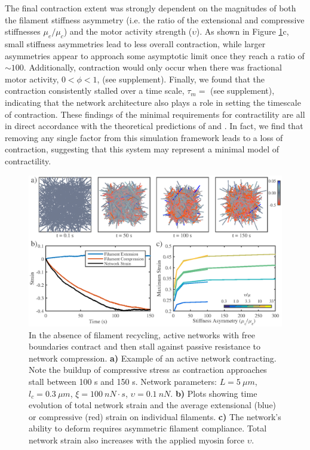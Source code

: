 \documentclass[10pt,letterpaper]{article}
\begin{document}
The final contraction extent was strongly dependent on the magnitudes of both the filament stiffness asymmetry (i.e. the ratio of the extensional and compressive stiffnesses $\mu_e/\mu_c$) and the motor activity strength ($\upsilon$).  As shown in Figure \ref{fig:active_con}c, small stiffness asymmetries lead to less overall contraction, while larger asymmetries appear to approach some asymptotic limit once they reach a ratio of $\sim 100$.  Additionally, contraction would only occur when there was fractional motor activity, $0<\phi<1$, (see supplement).  Finally, we found that the contraction consistently stalled over a time scale, $\tau_m=$ (see supplement), indicating that the network architecture also plays a role in setting the timescale of contraction.  These findings of the minimal requirements for contractility are all in direct accordance with the theoretical predictions of \cite{1367-2630-14-3-033037} and \cite{PhysRevX.4.041002}.  In fact, we find that removing any single factor from this simulation framework leads to a loss of contraction, suggesting that this system may represent a minimal model of contractility. 

\begin{figure}[h!]
	\centering
	\includegraphics[width=\hsize]{figures/figure4a}
	\caption{\label{fig:active_con} In the absence of filament recycling, active networks with free boundaries contract and then stall against passive resistance to network compression. \textbf{a)}  Example of an active network contracting. Note the buildup of compressive stress as contraction approaches stall between 100 s and 150 s.  Network parameters: $L=5\: \mu m$, $l_c=0.3\: \mu m$, $\xi=100\: nN\cdot s$, $\upsilon=0.1\: nN$.  \textbf{b)} Plots showing time evolution of total network strain and  the average extensional (blue) or compressive (red) strain on individual filaments.   \textbf{c)} The network's ability to deform requires asymmetric filament compliance.  Total network strain also increases with the applied myosin force $\upsilon$.}
\end{figure}
\end{document}
